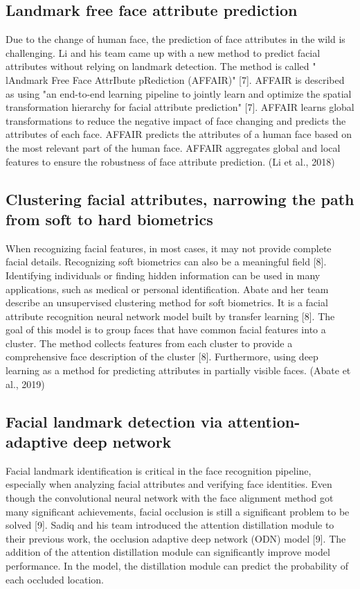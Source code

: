 \documentclass{article}
\begin{document}
\subsection{Landmark free face attribute prediction}
Due to the change of human face, the prediction of face attributes in the wild is challenging. Li and his team came up with a new method to predict facial attributes without relying on landmark detection. The method is called " lAndmark Free Face AttrIbute pRediction (AFFAIR)" [7]. AFFAIR is described as using "an end-to-end learning pipeline to jointly learn and optimize the spatial transformation hierarchy for facial attribute prediction" [7]. AFFAIR learns global transformations to reduce the negative impact of face changing and predicts the attributes of each face. AFFAIR predicts the attributes of a human face based on the most relevant part of the human face. AFFAIR aggregates global and local features to ensure the robustness of face attribute prediction. (Li et al., 2018)

\subsection{Clustering facial attributes, narrowing the path from soft to hard biometrics}
When recognizing facial features, in most cases, it may not provide complete facial details. Recognizing soft biometrics can also be a meaningful field [8]. Identifying individuals or finding hidden information can be used in many applications, such as medical or personal identification. Abate and her team describe an unsupervised clustering method for soft biometrics. It is a facial attribute recognition neural network model built by transfer learning [8]. The goal of this model is to group faces that have common facial features into a cluster. The method collects features from each cluster to provide a comprehensive face description of the cluster [8]. Furthermore, using deep learning as a method for predicting attributes in partially visible faces. (Abate et al., 2019)

\subsection{Facial landmark detection via attention-adaptive deep network}
Facial landmark identification is critical in the face recognition pipeline, especially when analyzing facial attributes and verifying face identities. Even though the convolutional neural network with the face alignment method got many significant achievements, facial occlusion is still a significant problem to be solved [9]. Sadiq and his team introduced the attention distillation module to their previous work, the occlusion adaptive deep network (ODN) model [9]. The addition of the attention distillation module can significantly improve model performance. In the model, the distillation module can predict the probability of each occluded location.
\end{document}
